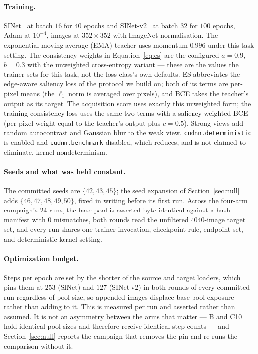 \documentclass{article}
\begin{document}
\paragraph{Training.} SINet~\citep{fan2020sinet} at batch $16$ for $40$ epochs and
SINet-v2~\citep{fan2022concealed} at batch $32$ for $100$ epochs, Adam at $10^{-4}$, images at
$352 \times 352$ with ImageNet normalisation. The exponential-moving-average (EMA) teacher uses momentum $0.996$ under this task
setting. The consistency weights in Equation~\ref{eq:es} are the configured $a = 0.9$, $b = 0.3$
with the unweighted cross-entropy variant --- these are the values the trainer sets for this task,
not the loss class's own defaults. ES abbreviates the edge-aware saliency loss of the protocol we
build on; both of its terms are per-pixel means (the $\ell_1$ norm is averaged over pixels), and BCE
takes the teacher's output as its target. The acquisition score uses exactly this unweighted form; the training consistency loss uses the same two terms with a saliency-weighted BCE (per-pixel weight
equal to the teacher's output plus $c = 0.5$). Strong views add random autocontrast and Gaussian blur to the
weak view. \texttt{cudnn.deterministic} is enabled and \texttt{cudnn.benchmark} disabled, which
reduces, and is not claimed to eliminate, kernel nondeterminism.

\paragraph{Seeds and what was held constant.} The committed seeds are $\{42, 43, 45\}$; the seed
expansion of Section~\ref{sec:null} adds $\{46, 47, 48, 49, 50\}$, fixed in writing before its first
run. Across the four-arm campaign's $24$ runs, the base pool is asserted byte-identical against a
hash manifest with $0$ mismatches, both rounds read the unfiltered $4040$-image target set, and every run shares one trainer invocation, checkpoint rule, endpoint set, and deterministic-kernel
setting.

\paragraph{Optimization budget.} Steps per epoch are set by the shorter of the source and target
loaders, which pins them at $253$ (SINet) and $127$ (SINet-v2) in both rounds of every committed run
regardless of pool size, so appended images displace base-pool exposure rather than adding to it.
This is measured per run and asserted rather than assumed. It is not an asymmetry between the arms
that matter --- B and C10 hold identical pool sizes and therefore receive identical step counts ---
and Section~\ref{sec:null} reports the campaign that removes the pin and re-runs the comparison
without it.
\end{document}

